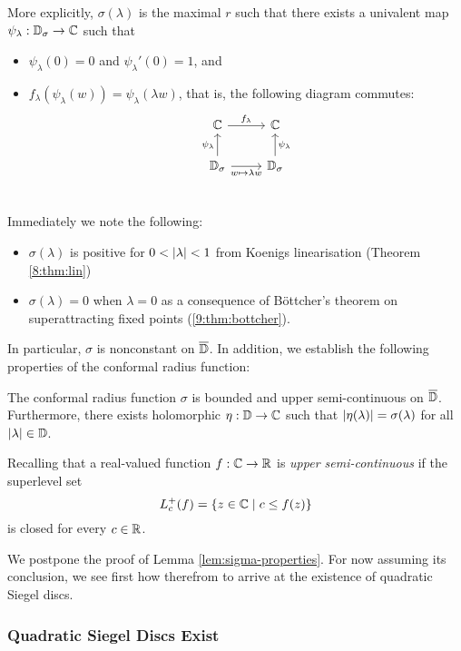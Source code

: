\documentclass[../main.tex]{subfiles}
\begin{document}
More explicitly, $\sigma(\lambda)$ is the maximal $r$ such that there exists a univalent map $\psi_\lambda : \mathbb{D}_\sigma \to \mathbb{C}$ such that
\begin{itemize}
    \item $\psi_\lambda(0) = 0$  and $\psi_\lambda'(0) = 1$, and
    \item $f_\lambda(\psi_\lambda(w)) = \psi_\lambda(\lambda w)$, that is, the following diagram commutes:
    \[
    \begin{tikzcd}
    \C \ar[r, "f_\lambda"] & \C \\
    \D_\sigma \ar[u, "\psi_\lambda"]
    \ar[r, "w \mapsto \lambda w"'] & 
    \D_\sigma \ar[u, "\psi_\lambda"'] \\
    \end{tikzcd}
    \]
\end{itemize}

Immediately we note the following:
\begin{itemize}
    \item $\sigma(\lambda)$ is positive for $0 < \left|\lambda\right| < 1$ from Koenigs linearisation (Theorem \ref{8:thm:lin})
    \item $\sigma(\lambda) = 0$ when $\lambda = 0$ as a consequence of Böttcher's theorem on superattracting fixed points (\ref{9:thm:bottcher}). 
\end{itemize}

In particular, $\sigma$ is nonconstant on $\overline{\mathbb{D}}$. In addition, we establish the following properties of the conformal radius function:

\begin{lem}\label{lem:sigma-properties}
The conformal radius function $\sigma$ is bounded and upper semi-continuous on $\overline{\mathbb{D}}$. Furthermore, there exists holomorphic $\eta : \mathbb{D} \to \mathbb{C}$ such that $\left|\eta(\lambda)\right| = \sigma(\lambda)$ for all $\left|\lambda\right| \in \mathbb{D}$.
\end{lem}

Recalling that a real-valued function $f : \mathbb{C} \to \mathbb{R}$ is \emph{upper semi-continuous} if the superlevel set
\[
    L_{c}^+(f) = \left\{ z \in \mathbb{C} \mid c \le f(z) \right\}
\]
is closed for every $c \in \mathbb{R}$.

We postpone the proof of Lemma \ref{lem:sigma-properties}. For now assuming its conclusion, we see first how therefrom to arrive at the existence of quadratic Siegel discs.

\subsubsection{Quadratic Siegel Discs Exist}
\end{document}
